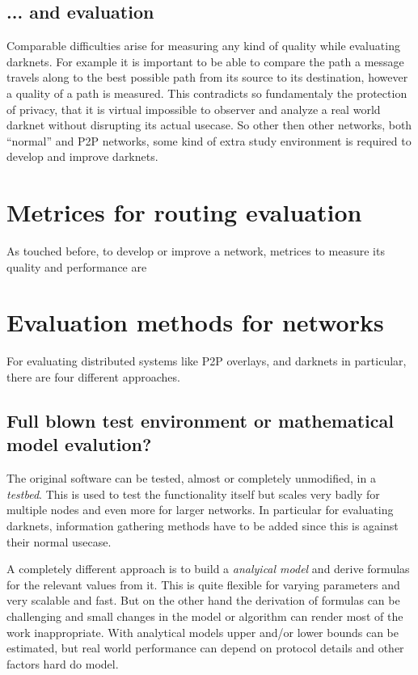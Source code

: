 \subsection{... and evaluation}

Comparable difficulties arise for measuring any kind of quality while evaluating darknets. For example it is important to be able to compare the path a message travels along to the best possible path from its source to its destination, however a quality of a path is measured. This contradicts so fundamentaly the protection of privacy, that it is virtual impossible to observer and analyze a real world darknet without disrupting its actual usecase. So other then other networks, both ``normal'' and P2P networks, some kind of extra study environment is required to develop and improve darknets.


\section{Metrices for routing evaluation}

As touched before, to develop or improve a network, metrices to measure its quality and performance are 

\section{Evaluation methods for networks}

For evaluating distributed systems like P2P overlays, and darknets in particular, there are four different approaches. 

\subsection{Full blown test environment or mathematical model evalution?}

The original software can be tested, almost or completely unmodified, in a \emph{testbed}. This is used to test the functionality itself but scales very badly for multiple nodes and even more for larger networks. In particular for evaluating darknets, information gathering methods have to be added since this is against their normal usecase. 

A completely different approach is to build a \emph{analyical model} and derive formulas for the relevant values from it. This is quite flexible for varying parameters and very scalable and fast. But on the other hand the derivation of formulas can be challenging and small changes in the model or algorithm can render most of the work inappropriate. With analytical models upper and/or lower bounds can be estimated, but real world performance can depend on protocol details and other factors hard do model.

